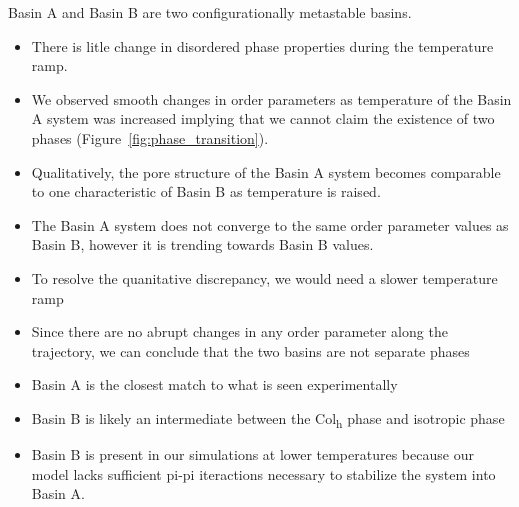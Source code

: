 \documentclass{article}
\begin{document}
  Basin A and Basin B are two configurationally metastable basins.
  \begin{itemize}
        \item There is litle change in disordered phase properties during the 
        temperature ramp.
	\item We observed smooth changes in order parameters as temperature
        of the Basin A system was increased implying that we cannot claim the
	existence of two phases (Figure~\ref{fig:phase_transition}).
	\item Qualitatively, the pore structure of the Basin A system becomes
        comparable to one characteristic of Basin B as temperature is raised.
	\item The Basin A system does not converge to the same order parameter
	values as Basin B, however it is trending towards Basin B values.
	\item To resolve the quanitative discrepancy, we would need a slower 
	temperature ramp
	\item Since there are no abrupt changes in any order parameter along the 
	trajectory, we can conclude that the two basins are not separate phases
	\item Basin A is the closest match to what is seen experimentally
	\item Basin B is likely an intermediate between the Col\textsubscript{h} 
	phase and isotropic phase
	\item Basin B is present in our simulations at lower temperatures 
	because our model lacks sufficient pi-pi iteractions necessary to 
	stabilize the system into Basin A. 
  \end{itemize} 
\end{document}
